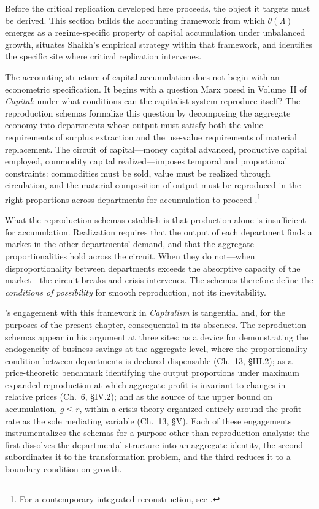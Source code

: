 Before the critical replication developed here proceeds, the object it targets must be derived. This section builds the accounting framework from which $\theta(\Lambda)$ emerges as a regime-specific property of capital accumulation under unbalanced growth, situates Shaikh's empirical strategy within that framework, and identifies the specific site where critical replication intervenes.

The accounting structure of capital accumulation does not begin with an econometric specification. It begins with a question Marx posed in Volume~II of \textit{Capital}: under what conditions can the capitalist system reproduce itself? The reproduction schemas formalize this question by decomposing the aggregate economy into departments whose output must satisfy both the value requirements of surplus extraction and the use-value requirements of material replacement. The circuit of capital---money capital advanced, productive capital employed, commodity capital realized---imposes temporal and proportional constraints: commodities must be sold, value must be realized through circulation, and the material composition of output must be reproduced in the right proportions across departments for accumulation to proceed \citep{MarxKVII}.\footnote{For a contemporary integrated reconstruction, see \citet[Ch.~4]{Basu2022}.}

What the reproduction schemas establish is that production alone is insufficient for accumulation. Realization requires that the output of each department finds a market in the other departments' demand, and that the aggregate proportionalities hold across the circuit. When they do not---when disproportionality between departments exceeds the absorptive capacity of the market---the circuit breaks and crisis intervenes. The schemas therefore define the \textit{conditions of possibility} for smooth reproduction, not its inevitability.

\citet{Shaikh2016}'s engagement with this framework in \emph{Capitalism} is tangential and, for the purposes of the present chapter, consequential in its absences. The reproduction schemas appear in his argument at three sites: as a device for demonstrating the endogeneity of business savings at the aggregate level, where the proportionality condition between departments is declared dispensable (Ch.~13, \S III.2); as a price-theoretic benchmark identifying the output proportions under maximum expanded reproduction at which aggregate profit is invariant to changes in relative prices (Ch.~6, \S IV.2); and as the source of the upper bound on accumulation, $g \leq r$, within a crisis theory organized entirely around the profit rate as the sole mediating variable (Ch.~13, \S V). Each of these engagements instrumentalizes the schemas for a purpose other than reproduction analysis: the first dissolves the departmental structure into an aggregate identity, the second subordinates it to the transformation problem, and the third reduces it to a boundary condition on growth.

